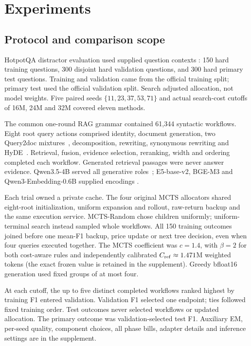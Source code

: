 \section{Experiments}
\label{sec:experiments}
\subsection{Protocol and comparison scope}
HotpotQA distractor evaluation used supplied question contexts
\citep{yang2018hotpotqa}: 150 hard training questions, 300 disjoint hard
validation questions, and 300 hard primary test questions. Training and
validation came from the official training split; primary test used the
official validation split. Search adjusted allocation, not model weights.
Five paired seeds $\{11,23,37,53,71\}$ and actual search-cost cutoffs of
16M, 24M and 32M covered eleven methods.

The common one-round RAG grammar contained 61,344 syntactic workflows.
Eight root query actions comprised identity, document generation, two
Query2doc mixtures~\citep{wang2023query2doc}, decomposition, rewriting,
synonymous rewriting and HyDE~\citep{gao2023hyde}. Retrieval, fusion,
evidence selection, reranking, width and ordering completed each workflow.
Generated retrieval passages were never answer evidence. Qwen3.5-4B served
all generative roles~\citep{qwen2026qwen35}; E5-base-v2, BGE-M3 and
Qwen3-Embedding-0.6B supplied encodings
\citep{wang2022e5,chen2024bgem3,zhang2025qwenembedding}.

Each trial owned a private cache. The four original MCTS allocators shared
eight-root initialization, uniform expansion and rollout,
raw-return backup and the same execution service. MCTS-Random chose children
uniformly; uniform-terminal search instead sampled whole workflows.
All 150 training outcomes joined before one mean-F1 backup, price update
or next tree decision, even when four queries executed together.
The MCTS coefficient was $c=1.4$, with $\beta=2$ for both cost-aware rules
and independently calibrated $C_{\rm ref}\approx1.471$M weighted tokens
(the exact frozen value is retained in the supplement).
Greedy bfloat16 generation used fixed groups of at most four.

At each cutoff, the up to five distinct completed workflows ranked highest
by training F1 entered validation. Validation F1 selected one endpoint;
ties followed fixed training order. Test outcomes never selected workflows
or updated allocation. The primary outcome was validation-selected test F1.
Auxiliary EM, per-seed quality, component choices, all phase bills, adapter
details and inference settings are in the supplement.

